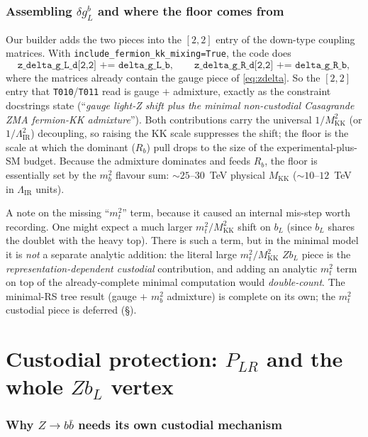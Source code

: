\documentclass[11pt]{article}
\newcommand{\MKK}{M_{\mathrm{KK}}}
\newcommand{\LIR}{\Lambda_{\mathrm{IR}}}
\newcommand{\PLR}{P_{LR}}
\newcommand{\code}[1]{\texttt{#1}}
\newcommand{\dgL}{\delta g_L^b}
\theoremstyle{definition}
\begin{document}
\section{Assembling $\dgL$ and where the floor comes from}
\label{sec:assemble}

Our builder adds the two pieces into the $[2,2]$ entry of the down-type coupling
matrices. With \code{include\_fermion\_kk\_mixing=True}, the code does
\begin{equation}
\code{z\_delta\_g\_L\_d[2,2] += delta\_g\_L\_b},
\qquad
\code{z\_delta\_g\_R\_d[2,2] += delta\_g\_R\_b},
\end{equation}
where the matrices already contain the gauge piece of \eqref{eq:zdelta}. So the
$[2,2]$ entry that \code{T010}/\code{T011} read is gauge $+$ admixture, exactly
as the constraint docstrings state (``\emph{gauge light-Z shift plus the minimal
non-custodial Casagrande ZMA fermion-KK admixture}''). Both contributions carry
the universal $1/\MKK^2$ (or $1/\LIR^2$) decoupling, so raising the KK scale
suppresses the shift; the floor is the scale at which the dominant ($R_b$) pull
drops to the size of the experimental-plus-SM budget. Because the admixture
dominates and feeds $R_b$, the floor is essentially set by the $m_b^2$ flavour
sum: $\sim 25$--$30$~TeV physical $\MKK$ ($\sim 10$--$12$~TeV in $\LIR$ units).

A note on the missing ``$m_t^2$'' term, because it caused an internal
mis-step worth recording. One might expect a much larger $m_t^2/\MKK^2$ shift on
$b_L$ (since $b_L$ shares the doublet with the heavy top). There is such a term,
but in the minimal model it is \emph{not} a separate analytic addition: the
literal large $m_t^2/\MKK^2$ $Zb_L$ piece is the \emph{representation-dependent
custodial} contribution, and adding an analytic $m_t^2$ term on top of the
already-complete minimal computation would \emph{double-count}. The minimal-RS
tree result (gauge $+$ $m_b^2$ admixture) is complete on its own; the $m_t^2$
custodial piece is deferred (\S\ref{part:cust}).

\part{Custodial protection: $\PLR$ and the whole $Zb_L$ vertex}
\label{part:cust}

\section{Why $Z\to b\bar b$ needs its own custodial mechanism}
\label{sec:needplr}
\end{document}

